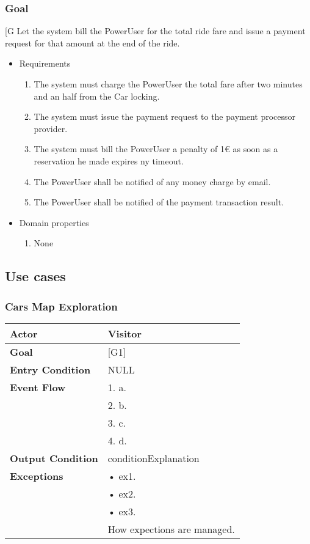     \subsubsection{Goal }
    {[}G\arabic{goalctr}{]}
    Let the system bill the PowerUser for the total ride fare and issue a payment request for that amount at the end of the ride.
    \begin{itemize}
        \item Requirements
        \begin{enumerate}[REQ]
    			\item The system must charge the PowerUser the total fare after two minutes and an half from the Car locking.
    			\item The system must issue the payment request to the payment processor provider.	
    			\item The system must bill the PowerUser a penalty of 1$\euro$ as soon as a reservation he made expires ny timeout.
    			\item The PowerUser shall be notified of any money charge by email.
    			\item The PowerUser shall be notified of the payment transaction result.
        \end{enumerate}
        \item Domain properties
        \begin{enumerate}[PRO]
    			\item None
        \end{enumerate}
    \end{itemize}


\subsection{Use cases}


\subsubsection{Cars Map Exploration}
\begin{tabular}{| l | p{8cm} |}
\hline
\textbf{Actor}      &       Visitor \\
\hline
\textbf{Goal}       &       [G1]\\
\hline
\textbf{Entry Condition} &  NULL\\
\hline
\textbf{Event Flow}     &   1.	a.\\&
                                            2.	b.\\&
                                            3.	c.\\&
                                            4.  d.\\
\hline
\textbf{Output Condition} & conditionExplanation\\
\hline
\textbf{Exceptions} &       •   ex1.\\& 
                            •	ex2.\\&
                            •	ex3.\\& 
                           How expections are managed.\\
\hline
\end{tabular} 


